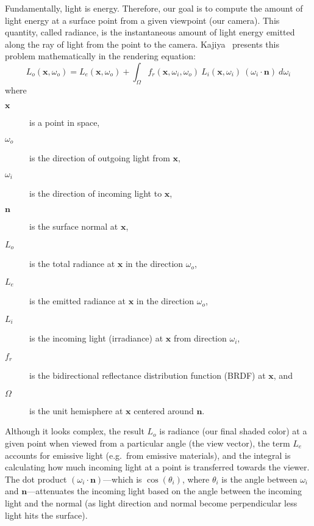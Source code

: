 Fundamentally, light is energy. Therefore, our goal is to compute the amount of light energy at a surface point from a given viewpoint (our camera). This quantity, called radiance, is the instantaneous amount of light energy emitted along the ray of light from the point to the camera. Kajiya~\cite{Kajiya:1986:RE:15886.15902} presents this problem mathematically in the rendering equation:
\begin{equation*}
    L_o(\bm{x}, \omega_o) = L_e(\bm{x}, \omega_o) + \int_\Omega f_r(\bm{x}, \omega_i, \omega_o)\ L_i(\bm{x}, \omega_i)\ (\omega_i \cdot \bm{n})\ d\omega_i
\end{equation*}
where
\begin{description}
    \item[$\bm{x}$] is a point in space,
    \item[$\omega_o$] is the direction of outgoing light from $\bm{x}$,
    \item[$\omega_i$] is the direction of incoming light to $\bm{x}$,
    \item[$\bm{n}$] is the surface normal at $\bm{x}$,
    \item[$L_o$] is the total radiance at $\bm{x}$ in the direction $\omega_o$,
    \item[$L_e$] is the emitted radiance at $\bm{x}$ in the direction $\omega_o$,
    \item[$L_i$] is the incoming light (irradiance) at $\bm{x}$ from direction $\omega_i$,
    \item[$f_r$] is the bidirectional reflectance distribution function (BRDF) at $\bm{x}$, and
    \item[$\Omega$] is the unit hemisphere at $\bm{x}$ centered around $\bm{n}$.
\end{description}

Although it looks complex, the result $L_o$ is radiance (our final shaded color) at a given point when viewed from a particular angle (the view vector), the term $L_e$ accounts for emissive light (e.g.\ from emissive materials), and the integral is calculating how much incoming light at a point is transferred towards the viewer. The dot product $(\omega_i \cdot \bm{n})$---which is $\cos(\theta_i)$, where $\theta_i$ is the angle between $\omega_i$ and $\bm{n}$---attenuates the incoming light based on the angle between the incoming light and the normal (as light direction and normal become perpendicular less light hits the surface).


